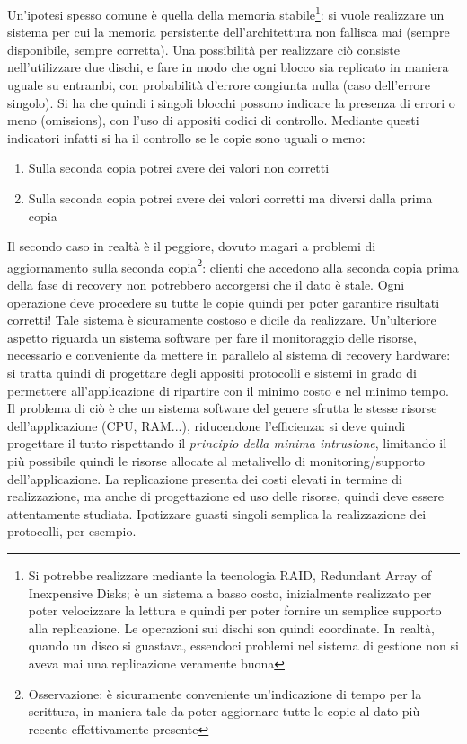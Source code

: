 Un'ipotesi spesso comune è quella della memoria stabile\footnote{Si potrebbe realizzare mediante la tecnologia RAID,
Redundant Array of Inexpensive Disks; è un sistema a basso costo, inizialmente realizzato per poter velocizzare la
lettura e quindi per poter fornire un semplice supporto alla replicazione. Le operazioni sui dischi son quindi
coordinate. In realtà, quando un disco si guastava, essendoci problemi nel sistema di gestione non si aveva mai una
replicazione veramente buona}: si vuole realizzare un sistema per cui la memoria persistente dell'architettura non
fallisca mai (sempre disponibile, sempre corretta). Una possibilità per realizzare ciò consiste nell'utilizzare due
dischi, e fare in modo che ogni blocco sia replicato in maniera uguale su entrambi, con probabilità d'errore congiunta
nulla (caso dell'errore singolo). Si ha che quindi i singoli blocchi possono indicare la presenza di errori o meno
(omissions), con l'uso di appositi codici di controllo. Mediante questi indicatori infatti si ha il controllo se le
copie sono uguali o meno:
\begin{enumerate}
 \item Sulla seconda copia potrei avere dei valori non corretti
 \item Sulla seconda copia potrei avere dei valori corretti ma diversi dalla prima copia
\end{enumerate}
Il secondo caso in realtà è il peggiore, dovuto magari a problemi di aggiornamento sulla seconda
copia\footnote{Osservazione: è sicuramente conveniente un'indicazione di tempo per la scrittura, in maniera tale da
poter aggiornare tutte le copie al dato più recente effettivamente presente}: clienti che accedono alla seconda copia
prima della fase di recovery non potrebbero accorgersi che il dato è stale. Ogni operazione deve procedere su tutte le
copie quindi per poter garantire risultati corretti! Tale sistema è sicuramente costoso e dicile da realizzare.
Un'ulteriore aspetto riguarda un sistema software per fare il monitoraggio delle risorse, necessario e conveniente da
mettere in parallelo al sistema di recovery hardware: si tratta quindi di progettare degli appositi protocolli e sistemi
in grado di permettere all'applicazione di ripartire con il minimo costo e nel minimo tempo. Il problema di ciò è che un
sistema software del genere sfrutta le stesse risorse dell'applicazione (CPU, RAM...), riducendone l'efficienza: si
deve quindi progettare il tutto rispettando il \textit{principio della minima intrusione}, limitando il più possibile
quindi le risorse allocate al metalivello di monitoring/supporto dell'applicazione. La replicazione presenta dei costi
elevati in termine di realizzazione, ma anche di progettazione ed uso delle risorse, quindi deve essere attentamente
studiata. Ipotizzare guasti singoli semplica la realizzazione dei protocolli, per esempio.

